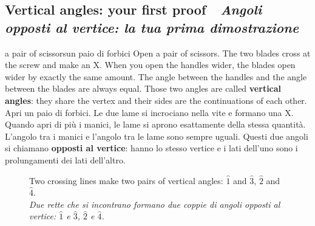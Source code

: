 \documentclass[10pt,a4paper,oneside]{book}
\newcommand{\bisubsection}[2]{%
  \Needspace{6\baselineskip}%
  \subsection[#1 \textperiodcentered\ #2]{#1 {\color{itgreen}\itshape\,\textperiodcentered\ #2}}}
\newcommand{\bicap}[2]{\caption{#1\\{\color{itgreen}\itshape #2}}}
\newcommand{\av}[1]{\widehat{#1}}           %
\begin{document}
\bisubsection{Vertical angles: your first proof}{Angoli opposti al vertice: la tua prima dimostrazione}\label{sec:vertical}
\begin{anchor}{a pair of scissors}{un paio di forbici}
Open a pair of scissors. The two blades cross at the screw and make an X. When you open the handles wider, the blades open wider by exactly the same amount. The angle between the handles and the angle between the blades are always equal. Those two angles are called \textbf{vertical angles}: they share the vertex and their sides are the continuations of each other.
\tcblower
Apri un paio di forbici. Le due lame si incrociano nella vite e formano una X. Quando apri di più i manici, le lame si aprono esattamente della stessa quantità. L'angolo tra i manici e l'angolo tra le lame sono sempre uguali. Questi due angoli si chiamano \textbf{opposti al vertice}: hanno lo stesso vertice e i lati dell'uno sono i prolungamenti dei lati dell'altro.
\end{anchor}

\begin{figure}[htbp]
\centering
\bicap{Two crossing lines make two pairs of vertical angles: $\av{1}$ and $\av{3}$, $\av{2}$ and $\av{4}$.}%
      {Due rette che si incontrano formano due coppie di angoli opposti al vertice: $\av{1}$ e $\av{3}$, $\av{2}$ e $\av{4}$.}
\label{fig:vertical}
\end{figure}
\end{document}
